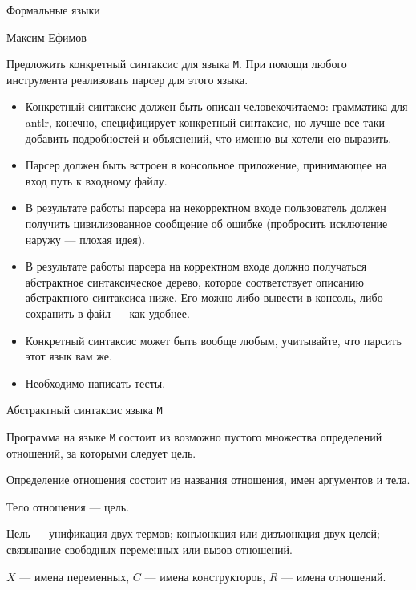 \documentclass[12pt]{article}
\begin{document}
\begin{center}
{\LARGE Формальные языки}

\bigskip

{\Large Максим Ефимов}
\end{center}

\bigskip

Предложить конкретный синтаксис для языка \verb!M!. При помощи любого инструмента реализовать парсер для этого языка.

\begin{itemize}
  \item Конкретный синтаксис должен быть описан человекочитаемо: грамматика для antlr, конечно, специфицирует конкретный синтаксис, но лучше все-таки добавить подробностей и объяснений, что именно вы хотели ею выразить.
  \item Парсер должен быть встроен в консольное приложение, принимающее на вход путь к входному файлу.
  \item В результате работы парсера на некорректном входе пользователь должен получить цивилизованное сообщение об ошибке (пробросить исключение наружу --- плохая идея).
  \item В результате работы парсера на корректном входе должно получаться абстрактное синтаксическое дерево, которое соответствует описанию абстрактного синтаксиса ниже. Его можно либо вывести в консоль, либо сохранить в файл --- как удобнее.
  \item Конкретный синтаксис может быть вообще любым, учитывайте, что парсить этот язык вам же.
  \item Необходимо написать тесты.
\end{itemize}


\begin{center}
    \Large{Абстрактный синтаксис языка \verb!М!}
\end{center}

Программа на языке \verb!M! состоит из возможно пустого множества определений отношений, за которыми следует цель.

Определение отношения состоит из названия отношения, имен аргументов и тела.

Тело отношения --- цель.

Цель --- унификация двух термов; конъюнкция или дизъюнкция двух целей; связывание свободных переменных или вызов отношений.

$X$ --- имена переменных, $C$ --- имена конструкторов, $R$ --- имена отношений.
\end{document}
